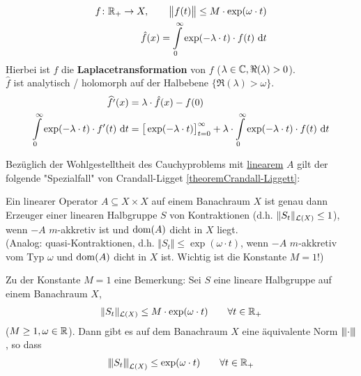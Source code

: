 \begin{align*}
	f\colon\mathbb{R}_+\to X,\qquad\big\Vert f(t)\big\Vert\leq M\cdot\exp(\omega\cdot t)\\
	\hat{f}(x)=\int\limits_0^\infty\exp(-\lambda\cdot t)\cdot f(t)\text{ d} t
\end{align*}
Hierbei ist $\hat{f}$ die \textbf{Laplacetransformation} von $f$ ($\lambda\in\mathbb{C},\Re(\lambda)>0$).\\
$\hat{f}$ ist analytisch / holomorph auf der Halbebene $\big\lbrace\Re(\lambda)>\omega\big\rbrace$. 
\begin{align*}
	\widehat{f'}(x)&=\lambda\cdot\hat{f}(x)-f(0)\\
	\int\limits_0^\infty\exp(-\lambda\cdot t)\cdot f'(t)\text{ d} t
	&=\big[\exp(-\lambda\cdot t)\big]_{t=0}^\infty+\lambda\cdot\int\limits_0^\infty\exp(-\lambda\cdot t)\cdot f(t)\text{ d} t
\end{align*}

Bezüglich der Wohlgestelltheit des Cauchyproblems mit \ul{linearem} $A$ gilt der folgende "Spezialfall" von Crandall-Ligget \ref{theoremCrandall-Liggett}:

\begin{theorem}\enter
	Ein linearer Operator $A\subseteq X\times X$ auf einem Banachraum $X$ ist genau dann Erzeuger einer linearen Halbgruppe $S$ von Kontraktionen 
	(d.h. $\Vert S_t\Vert_{\mathcal{L}(X)}\leq 1$), wenn $-A$ $m$-akkretiv ist und $\operatorname{dom}(A)$ dicht in $X$ liegt.\\
	(Analog: quasi-Kontraktionen, d.h. $\Vert S_t\Vert\leq\exp(\omega\cdot t)$, wenn $-A$ $m$-akkretiv vom Typ $\omega$ und $\operatorname{dom}(A)$ dicht in $X$ ist.
	Wichtig ist die Konstante $M=1$!)
\end{theorem}

\begin{bemerkung}
	Zu der Konstante $M=1$ eine Bemerkung: Sei $S$ eine lineare Halbgruppe auf einem Banachraum $X$,
	\begin{align*}
		\Vert S_t\Vert_{\mathcal{L}(X)}\leq M\cdot\exp(\omega\cdot t)\qquad\forall t\in\mathbb{R}_+
	\end{align*}
	($M\geq1,\omega\in\mathbb{R}$). 
	Dann gibt es auf dem Banachraum $X$ eine äquivalente Norm ${\left\vert\kern-0.25ex\left\vert\kern-0.25ex\left\vert \cdot \right\vert\kern-0.25ex\right\vert\kern-0.25ex\right\vert}$, so dass
	\begin{align*}
		{\left\vert\kern-0.25ex\left\vert\kern-0.25ex\left\vert S_t \right\vert\kern-0.25ex\right\vert\kern-0.25ex\right\vert}_{\mathcal{L}(X)}\leq\exp(\omega\cdot t)\qquad\forall t\in\mathbb{R}_+
	\end{align*} 
\end{bemerkung}

